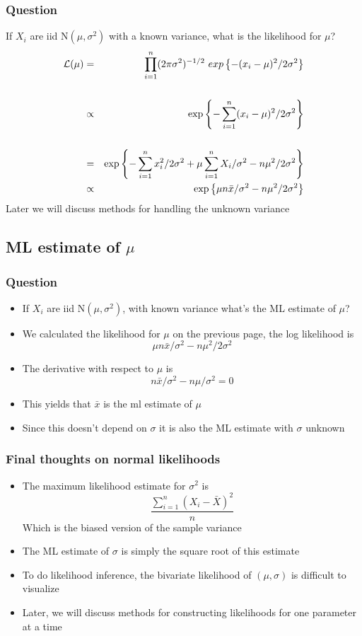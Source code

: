 \documentclass[aspectratio=169]{beamer}
\begin{document}
\begin{frame}\frametitle{Question}
If $X_i$ are iid $\mbox{N}(\mu, \sigma^2)$ with a known variance, what is the likelihood for $\mu$?
\begin{eqnarray*}
{\cal L}(\mu) & =    &  \prod_{i=1}^n  (2\pi \sigma^2)^{-1/2}\
exp\left\{-(x_i - \mu)^2/2\sigma^2\right\} \\ \\
              &\propto &  \exp\left\{-\sum_{i=1}^n (x_i - \mu)^2/2\sigma^2\right\} \\ \\
              & =    &  \exp\left\{-\sum_{i=1}^n x_i^2/2\sigma^2 + \mu \sum_{i=1}^n X_i / \sigma^2 - n \mu^2/2\sigma^2\right\}\\
              &\propto & \exp\left\{\mu n \bar x / \sigma^2 - n \mu^2/2\sigma^2\right\}
\end{eqnarray*}
Later we will discuss methods for handling the unknown variance
\end{frame}

\subsection{ML estimate of $\mu$}
\begin{frame}\frametitle{Question}
\begin{itemize}
\item If $X_i$ are iid $\mbox{N}(\mu, \sigma^2)$, with known  variance what's the ML estimate of $\mu$?
\item We calculated the likelihood for $\mu$ on the previous page, the log likelihood is
  $$
  \mu n \bar x / \sigma^2 - n \mu^2/2\sigma^2
  $$
\item The derivative with respect to $\mu$ is 
  $$
  n \bar x / \sigma^2 - n \mu / \sigma ^ 2 = 0
  $$
\item This yields that $\bar x$ is the ml estimate of $\mu$
\item Since this doesn't depend on $\sigma$ it is also the ML estimate with $\sigma$ unknown
\end{itemize}
\end{frame}

\begin{frame}\frametitle{Final thoughts on normal likelihoods}
\begin{itemize}
\item The maximum likelihood estimate for $\sigma^2$ is
  $$
  \frac{\sum_{i=1}^n (X_i - \bar X)^2}{n}
  $$
  Which is the biased version of the sample variance
\item The ML estimate of $\sigma$ is simply the square root of this
  estimate
\item To do likelihood inference, the bivariate likelihood of 
  $(\mu, \sigma)$ is difficult to visualize
\item Later, we will discuss methods for constructing likelihoods for
  one parameter at a time
\end{itemize}
\end{frame}
\end{document}

